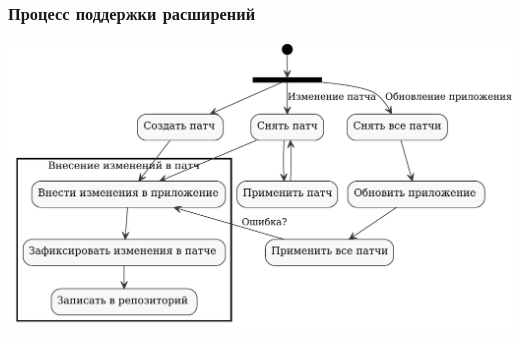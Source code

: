 \documentclass[unicode]{beamer}
\begin{document}
\begin{frame}
\transwipe[direction=90]
\frametitle{Процесс поддержки расширений}
\centerline{\includegraphics[width=1\textwidth]{mq-workflow.pdf}}
\end{frame}
\end{document}
